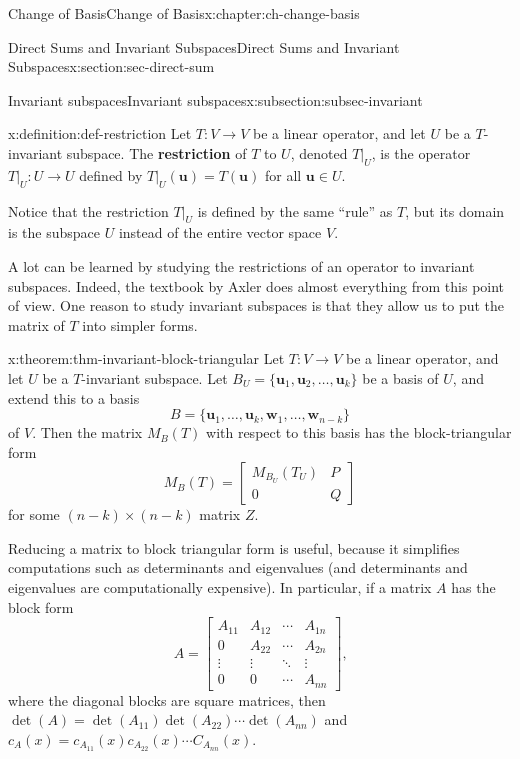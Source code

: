 \documentclass[oneside,10pt,]{book}
\newcommand{\terminology}[1]{\textbf{#1}}
\numberwithin{equation}{section}
\newcommand{\bbm}{\begin{bmatrix}}
\newcommand{\ebm}{\end{bmatrix}}
\newcommand{\uu}{\mathbf{u}}
\newcommand{\ww}{\mathbf{w}}
\newcommand{\basis}[2]{\{\mathbf{#1}_1,\mathbf{#1}_2,\ldots,\mathbf{#1}_{#2}\}}
\newcommand{\amp}{&}
\begin{document}
\begin{chapterptx}{Change of Basis}{}{Change of Basis}{}{}{x:chapter:ch-change-basis}
\begin{sectionptx}{Direct Sums and Invariant Subspaces}{}{Direct Sums and Invariant Subspaces}{}{}{x:section:sec-direct-sum}
\begin{subsectionptx}{Invariant subspaces}{}{Invariant subspaces}{}{}{x:subsection:subsec-invariant}
\begin{definition}{}{x:definition:def-restriction}%
Let \(T:V\to V\) be a linear operator, and let \(U\) be a \(T\)-invariant subspace. The \terminology{restriction} of \(T\) to \(U\), denoted \(T|_U\), is the operator \(T|_U:U\to U\) defined by \(T|_U(\uu)=T(\uu)\) for all \(\uu\in U\).%
\end{definition}
Notice that the restriction \(T|_U\) is defined by the same ``rule'' as \(T\), but its domain is the subspace \(U\) instead of the entire vector space \(V\).%
\par
A lot can be learned by studying the restrictions of an operator to invariant subspaces. Indeed, the textbook by Axler does almost everything from this point of view. One reason to study invariant subspaces is that they allow us to put the matrix of \(T\) into simpler forms.%
\begin{theorem}{}{}{x:theorem:thm-invariant-block-triangular}%
Let \(T:V\to V\) be a linear operator, and let \(U\) be a \(T\)-invariant subspace. Let \(B_U = \basis{u}{k}\) be a basis of \(U\), and extend this to a basis%
\begin{equation*}
B = \{\uu_1,\ldots, \uu_k,\ww_1,\ldots, \ww_{n-k}\}
\end{equation*}
of \(V\). Then the matrix \(M_B(T)\) with respect to this basis has the block-triangular form%
\begin{equation*}
M_B(T) = \bbm M_{B_U}(T_U) \amp P\\0 \amp Q\ebm
\end{equation*}
for some \((n-k)\times (n-k)\) matrix \(Z\).%
\end{theorem}
Reducing a matrix to block triangular form is useful, because it simplifies computations such as determinants and eigenvalues (and determinants and eigenvalues are computationally expensive). In particular, if a matrix \(A\) has the block form%
\begin{equation*}
A = \bbm A_{11} \amp A_{12} \amp \cdots \amp A_{1n}\\
0\amp A_{22} \amp \cdots \amp A_{2n}\\
\vdots \amp \vdots \amp \ddots \amp \vdots\\
0 \amp 0 \amp \cdots \amp A_{nn}\ebm\text{,}
\end{equation*}
where the diagonal blocks are square matrices, then \(\det(A) = \det(A_{11})\det(A_{22})\cdots \det(A_{nn})\) and \(c_A(x) = c_{A_{11}}(x)c_{A_{22}}(x)\cdots C_{A_{nn}}(x)\).%
\end{subsectionptx}
%
%
\typeout{************************************************}

\end{sectionptx}
\end{chapterptx}
\end{document}
